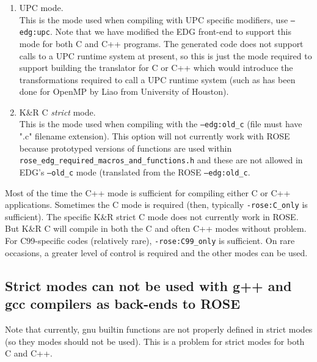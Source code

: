 \begin{enumerate}
   \item UPC mode. \\
        This is the mode used when compiling with UPC specific modifiers, use 
        {\tt --edg:upc}.  Note that we have modified the EDG front-end to support
        this mode for both C and C++ programs.  The generated code does not 
        support calls to a UPC runtime system at present, so this is just the 
        mode required to support building the translator for C or C++ which would
        introduce the transformations required to call a UPC runtime system (such
        as has been done for OpenMP by Liao from University of Houston).

   \item K\&R C {\em strict} mode. \\
        This is the mode used when compiling with the {\tt --edg:old\_c} (file must have ".c"
        filename extension).  This option will not currently work with ROSE because 
        prototyped versions of functions are used within
        {\tt rose\_edg\_required\_macros\_and\_functions.h} and these are not allowed in EDG's
        {\tt --old\_c} mode (translated from the ROSE {\tt --edg:old\_c}.
\end{enumerate}

  Most of the time the C++ mode is sufficient for compiling either C or C++ 
applications.  Sometimes the C mode is required (then, typically {\tt -rose:C\_only} is
sufficient).  The specific K\&R strict C mode does not currently work in ROSE. But
K\&R C will compile in both the C and often C++ modes without problem. For 
C99-specific codes (relatively rare), {\tt -rose:C99\_only} is sufficient.  On rare 
occasions, a greater level of control is required and the other modes can be used.

\subsection{Strict modes can not be used with g++ and gcc compilers as back-ends to ROSE}
   Note that currently, gnu builtin functions are not properly defined in strict 
modes (so they modes should not be used).  This is a problem for strict modes for 
both C and C++.

